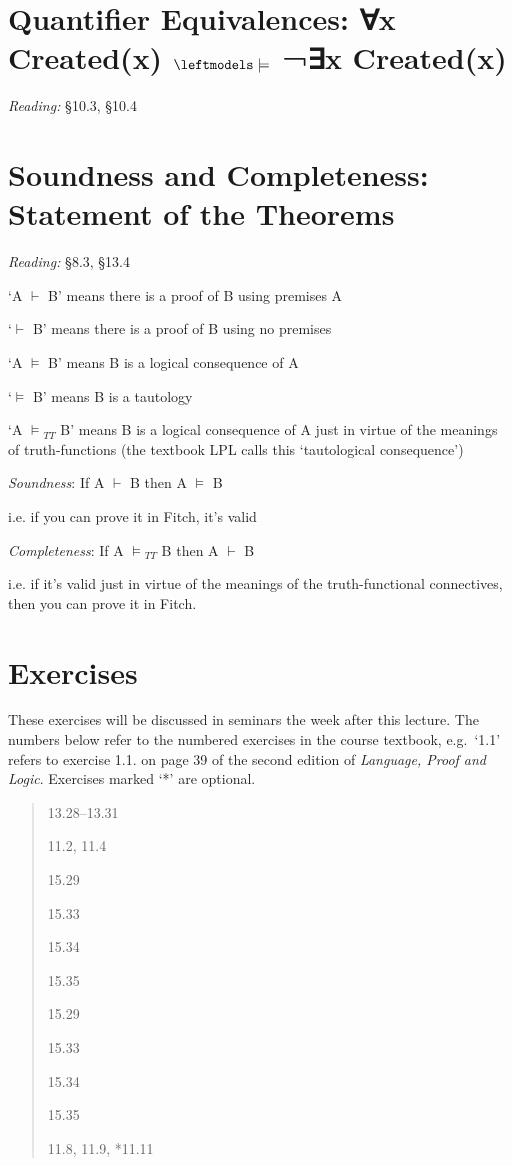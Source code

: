 \documentclass[12pt]{extarticle}
\begin{document}
\begin{multicols*}{3}
 
\section{Quantifier Equivalences: ∀x Created(x) $\leftmodels\models$ ¬∃x Created(x)}
 
\emph{Reading:} §10.3, §10.4
 
 
 \columnbreak
\section{Soundness and Completeness: Statement of the Theorems}
 
\emph{Reading:} §8.3, §13.4
 
‘A $\vdash$ B’ means there is a proof of B using premises A
 
‘$\vdash$ B’ means there is a proof of B using no premises
 
‘A $\models$ B’ means B is a logical consequence of A
 
‘$\models$ B’ means B is a tautology
 
‘A $\models$$_{TT}$ B’ means B is a logical consequence of A just in virtue of the meanings of truth-functions (the textbook LPL calls this ‘tautological consequence’)
 
\emph{Soundness}: If A $\vdash$ B then A $\models$ B
 
\hspace{3mm} i.e. if you can prove it in Fitch, it’s valid
 
\emph{Completeness}: If A $\models$$_{TT}$ B then A $\vdash$ B
 
\hspace{3mm} i.e. if it’s valid just in virtue of the meanings of the truth-functional connectives, then you can prove it in Fitch.
 
\vfill
\begin{minipage}{\columnwidth}
\section{Exercises}
These exercises will be discussed in seminars the week after this lecture.
The numbers below refer to the numbered exercises in the course textbook, e.g.\ `1.1' refers to exercise 1.1. on page 39 of the second edition of \emph{Language, Proof and Logic}. Exercises marked `*' are optional.
 
\begin{quote}
13.28--13.31
 
11.2, 11.4
 
15.29
 
15.33
 
15.34
 
15.35
 
15.29
 
15.33
 
15.34
 
15.35
 
11.8, 11.9, *11.11
 
\end{quote}
\end{minipage}


 

\end{multicols*}
\end{document}
